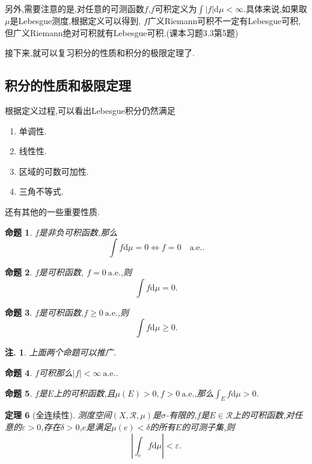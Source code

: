 \documentclass[12pt,a4paper,oneside]{ctexart}
\theoremstyle{nonumberplain}
\theoremstyle{plain}
\newtheorem{theorem}{定理}[section]
\theoremstyle{plain}
\theoremstyle{nonumberplain}
\newtheorem{remark}{注.}
\theoremstyle{plain}
\theoremstyle{plain}
\theoremstyle{plain}
\newtheorem{proposition}[theorem]{命题}
\theoremstyle{plain}
\newcommand{\dif}{\mathrm{d}}
\renewcommand{\epsilon}{\varepsilon}
\newcommand{\abs}[1]{\left\vert#1\right\vert}
\newcommand{\cR}{\mathcal{R}}
\renewcommand{\ae}{\mbox{a.e.}}
\begin{document}
    另外,需要注意的是,对任意的可测函数$f$,$f$可积定义为$\int |f|\dif\mu<\infty$.具体来说,如果取$\mu$是Lebesgue测度,根据定义可以得到,
    $f$广义Riemann可积不一定有Lebesgue可积,但广义Riemann绝对可积就有Lebesgue可积.(课本习题3.3第5题)

    接下来,就可以复习积分的性质和积分的极限定理了.

    \subsection{积分的性质和极限定理}

    根据定义过程,可以看出Lebesgue积分仍然满足
    \begin{enumerate}
        \item 单调性.
        \item 线性性.
        \item 区域的可数可加性.
        \item 三角不等式.
    \end{enumerate}

    还有其他的一些重要性质.
    \begin{proposition}
        $f$是非负可积函数,那么 
        \begin{equation*}
            \int f\dif\mu=0\Longleftrightarrow f=0 \quad\ae.
        \end{equation*}
    \end{proposition}
    \begin{proposition}
        $f$是可积函数, $f=0\ \ae$,则
        \begin{equation*}
            \int f\dif\mu=0.
        \end{equation*}
    \end{proposition}
    \begin{proposition}
        $f$是可积函数,$f\geqslant 0\ \ae$,则
        \begin{equation*}
            \int f\dif\mu\geqslant 0.
        \end{equation*}
    \end{proposition}
    \begin{remark}
        上面两个命题可以推广.
    \end{remark}
    \begin{proposition}
        $f$可积那么$|f|<\infty\ \ae$.
    \end{proposition}
    \begin{proposition}
        $f$是$E$上的可积函数,且$\mu(E)>0,f>0\ \ae$,那么$\int_Ef\dif\mu>0$.
    \end{proposition}
    \begin{theorem}[全连续性]
        测度空间$(X,\cR,\mu)$是$\sigma$-有限的,$f$是$E\in\cR$上的可积函数,对任意的$\epsilon>0$,存在$\delta>0$,$e$是满足$\mu(e)<\delta$的所有$E$的可测子集,则 
        \begin{equation*}
            \abs{\int_ef\dif\mu}<\epsilon.
        \end{equation*}
    \end{theorem}
\end{document}
